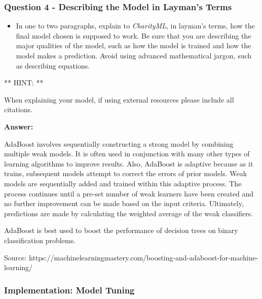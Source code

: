 \documentclass[11pt]{article}
\providecommand{\tightlist}{%
      \setlength{\itemsep}{0pt}\setlength{\parskip}{0pt}}
\begin{document}
    \hypertarget{question-4---describing-the-model-in-laymans-terms}{%
\subsubsection{Question 4 - Describing the Model in Layman's
Terms}\label{question-4---describing-the-model-in-laymans-terms}}

\begin{itemize}
\tightlist
\item
  In one to two paragraphs, explain to \emph{CharityML}, in layman's
  terms, how the final model chosen is supposed to work. Be sure that
  you are describing the major qualities of the model, such as how the
  model is trained and how the model makes a prediction. Avoid using
  advanced mathematical jargon, such as describing equations.
\end{itemize}

** HINT: **

When explaining your model, if using external resources please include
all citations.

    \textbf{Answer: }

AdaBoost involves sequentially constructing a strong model by combining
multiple weak models. It is often used in conjunction with many other
types of learning algorithms to improve results. Also, AdaBoost is
adaptive because as it trains, subsequent models attempt to correct the
errors of prior models. Weak models are sequentially added and trained
within this adaptive process. The process continues until a pre-set
number of weak learners have been created and no further improvement can
be made based on the input criteria. Ultimately, predictions are made by
calculating the weighted average of the weak classifiers.

AdaBoost is best used to boost the performance of decision trees on
binary classification problems.

Source:
https://machinelearningmastery.com/boosting-and-adaboost-for-machine-learning/

    \hypertarget{implementation-model-tuning}{%
\subsubsection{Implementation: Model
Tuning}\label{implementation-model-tuning}}
\end{document}
